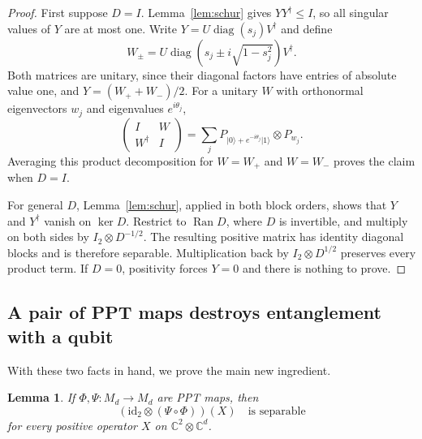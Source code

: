 \documentclass[aps,prl,reprint,superscriptaddress,longbibliography,raggedbottom]{revtex4-2}
\newtheorem{lemma}{Lemma}
\newcommand{\C}{\mathbb C}
\newcommand{\id}{\mathrm{id}}
\newcommand{\Ran}{\operatorname{Ran}}
\newcommand{\ket}[1]{\lvert #1\rangle}
\begin{document}
\begin{proof}
First suppose $D=I$. Lemma~\ref{lem:schur} gives $YY^\dagger\le I$,
so all singular values of $Y$ are at most one. Write
$Y=U\operatorname{diag}(s_j)V^\dagger$ and define
\begin{equation}\label{eq:unitaries}
W_\pm=U\operatorname{diag}\!\left(s_j\pm i\sqrt{1-s_j^2}\right)V^\dagger.
\end{equation}
Both matrices are unitary, since their diagonal factors have entries
of absolute value one, and $Y=(W_++W_-)/2$. For a unitary $W$ with
orthonormal eigenvectors $w_j$ and eigenvalues $e^{i\theta_j}$,
\begin{equation}\label{eq:product}
\begin{pmatrix}I&W\\W^\dagger&I\end{pmatrix}
=\sum_j P_{\ket0+e^{-i\theta_j}\ket1}\otimes P_{w_j}.
\end{equation}
Averaging this product decomposition for $W = W_+$ and $W = W_-$ proves the
claim when $D=I$.

For general $D$, Lemma~\ref{lem:schur}, applied in both block orders,
shows that $Y$ and $Y^\dagger$ vanish on $\ker D$. Restrict to
$\Ran D$, where $D$ is invertible, and multiply on both sides by
$I_2\otimes D^{-1/2}$. The resulting positive matrix has identity
diagonal blocks and is therefore separable. Multiplication back by
$I_2\otimes D^{1/2}$ preserves every product term. If $D=0$, positivity
forces $Y=0$ and there is nothing to prove.
\end{proof}

\subsection{A pair of PPT maps destroys entanglement with a qubit}
With these two facts in hand, we prove the main new ingredient.

\begin{lemma}\label{lem:pair}
If $\Phi,\Psi:M_d\to M_d$ are PPT maps, then
\begin{equation}\label{eq:pair}
(\id_2\otimes(\Psi\circ\Phi))(X)\quad\text{is separable}
\end{equation}
for every positive operator $X$ on $\C^2\otimes\C^d$.
\end{lemma}
\end{document}
